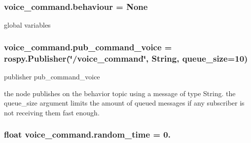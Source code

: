 \subsubsection[{\texorpdfstring{behaviour}{behaviour}}]{\setlength{\rightskip}{0pt plus 5cm}voice\+\_\+command.\+behaviour = None}\hypertarget{namespacevoice__command_a72126e703aca1aefdf96b1e11085ed89}{}\label{namespacevoice__command_a72126e703aca1aefdf96b1e11085ed89}


global variables 

\subsubsection[{\texorpdfstring{pub\+\_\+command\+\_\+voice}{pub_command_voice}}]{\setlength{\rightskip}{0pt plus 5cm}voice\+\_\+command.\+pub\+\_\+command\+\_\+voice = rospy.\+Publisher(\char`\"{}/voice\+\_\+command\char`\"{}, String, queue\+\_\+size=10)}\hypertarget{namespacevoice__command_a893d30fba12eb55a21111bdc1bab61d6}{}\label{namespacevoice__command_a893d30fba12eb55a21111bdc1bab61d6}


publisher pub\+\_\+command\+\_\+voice 

the node publishes on the behavior topic using a message of type String. the queue\+\_\+size argument limits the amount of queued messages if any subscriber is not receiving them fast enough. 
\subsubsection[{\texorpdfstring{random\+\_\+time}{random_time}}]{\setlength{\rightskip}{0pt plus 5cm}float voice\+\_\+command.\+random\+\_\+time = 0.}\hypertarget{namespacevoice__command_a43a92e567eb4143c1efb09aff88f4916}{}\label{namespacevoice__command_a43a92e567eb4143c1efb09aff88f4916}
